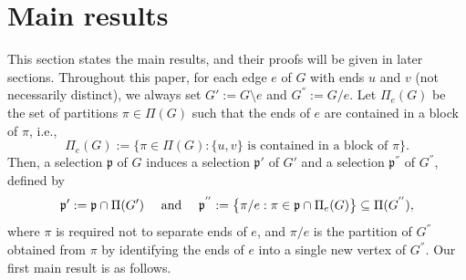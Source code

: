 \documentclass[12pt]{article}%
\numberwithin{equation}{section}
\def\And{\mbox{\rm ~and~}}
\begin{document}
\section{Main results}\label{Sec2-0}
This section states the main results, and their proofs will be given in later sections. Throughout this paper,  for each edge $e$ of $G$ with ends $u$ and $v$ (not necessarily distinct), we always set $G':=G\setminus e$ and $G^{''}:=G/e$. Let $\Pi_e(G)$ be the set of partitions $\pi\in\Pi(G)$ such that the ends of $e$ are contained in a block of $\pi$, i.e., 
\begin{equation}\label{Pi-e}
\Pi_e(G):=\big\{\pi\in\Pi(G):\{u,v\} \text{ is contained in a block of } \pi\big\}.
\end{equation}
Then, a selection $\mathfrak{p}$ of $G$ induces a selection $\mathfrak{p}'$ of  $G'$ and a selection $\mathfrak{p}^{''}$ of $G^{''}$,  defined by
\begin{equation}\label{Triple-Partitions}
\mathfrak{p}':=\mathfrak{p}\cap\Pi(G')\quad\And\quad \mathfrak{p}^{''}:=\big\{\pi/e:\pi\in\mathfrak{p}\cap\Pi_e(G)\big\}\subseteq\Pi(G^{''}),
\end{equation}
where $\pi$ is required not to separate ends of $e$, and $\pi/e$ is the partition of $G^{''}$ obtained from $\pi$ by identifying the ends of $e$ into a single new vertex of $G^{''}$. Our first main result is as follows.
\end{document}
